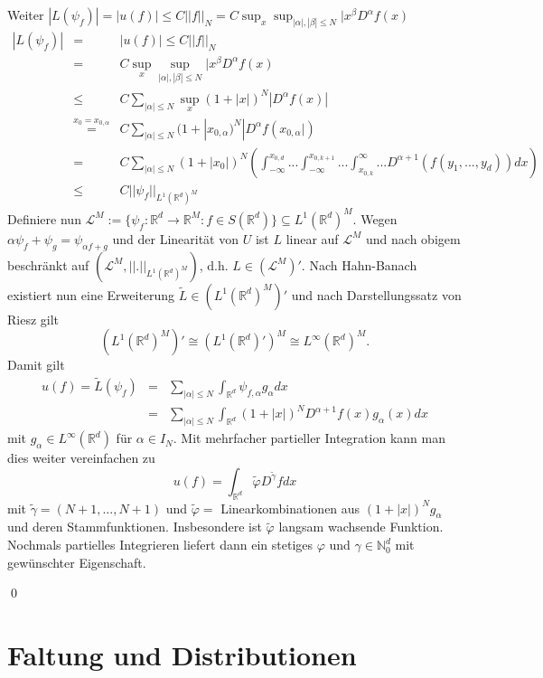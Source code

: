 \documentclass[12pt]{extreport} %
\numberwithin{equation}{section}
\newcommand{\R}{\mathbb{R}} %
\newcommand{\N}{\mathbb{N}} %
\begin{document}
\begin{enumerate}
		Weiter $|L(\psi_f)| = |u(f)|\leq C||f||_N = C\sup_x \sup_{|\alpha|,|\beta|\leq N}|x^\beta D^\alpha f(x)$
		\begin{eqnarray}
			|L(\psi_f)| &=& |u(f)|\leq C||f||_N\nonumber\\
			&=& C\sup_x \sup_{|\alpha|,|\beta|\leq N}|x^\beta D^\alpha f(x)\nonumber\\
			&\leq & C\sum_{|\alpha|\leq N} \sup_x(1+|x|)^N|D^\alpha f(x)|\nonumber\\
			&\overset{x_0 = x_{0,\alpha}}{=}& C\sum_{|\alpha|\leq N} (1+|x_{0,\alpha})^N|D^\alpha f(x_{0,\alpha}|)\nonumber\\
			&=& C \sum_{|\alpha|\leq N} (1+|x_0|)^N \left( \int_{-\infty}^{x_{0,d}}...\int_{-\infty}^{x_{0,k+1}}...\int_{x_{0,k}}^{\infty}... D^{\alpha+1}(f(y_1,...,y_d))dx  \right)\nonumber\\
			&\leq& C||\psi_f||_{L^1(\R^d)^M}\nonumber
		\end{eqnarray}
		Definiere nun $\mathcal{L}^M:=\{\psi_f:\R^d\rightarrow\R^M: f\in S(\R^d) \}\subseteq L^1(\R^d)^M$. Wegen $\alpha\psi_f+\psi_g = \psi_{\alpha f+g}$ und der Linearität von $U$ ist $L$ linear auf $\mathcal{L}^M$ und nach obigem beschränkt auf $(\mathcal{L}^M,||.||_{L^1(\R^d)^M})$, d.h. $L\in (\mathcal{L}^{M})'$. Nach Hahn-Banach existiert nun eine Erweiterung $\tilde{L}\in (L^1(\R^d)^M)'$ und nach Darstellungssatz von Riesz gilt
		$$(L^1(\R^d)^M)'\cong (L^1(\R^d)')^M\cong L^\infty(\R^d)^M.$$
		Damit gilt 
		\begin{eqnarray}
			u(f) = \tilde{L}(\psi_f) &=& \sum_{|\alpha|\leq N}\int_{\R^d}\psi_{f,\alpha}g_\alpha dx\nonumber\\
			&=&\sum_{|\alpha|\leq N}\int_{\R^d} (1+|x|)^N D^{\alpha + 1}f(x) g_\alpha(x) dx\nonumber
		\end{eqnarray}
		mit $g_\alpha\in L^\infty(\R^d)$ für $\alpha\in I_N$.
		Mit mehrfacher partieller Integration kann man dies weiter vereinfachen zu
		$$u(f) = \int_{\R^d} \tilde{\varphi}D^{\tilde{\gamma}}f dx$$
		mit $\tilde{\gamma} = (N+1,...,N+1)$ und $\tilde{\varphi}=$ Linearkombinationen aus $(1+|x|)^Ng_\alpha$ und deren Stammfunktionen. Insbesondere ist $\tilde{\varphi}$ langsam wachsende Funktion. Nochmals partielles Integrieren liefert dann ein stetiges $\varphi$ und $\gamma\in \N_0^d$ mit gewünschter Eigenschaft.
	\end{enumerate}
	\qed
	
	\section{Faltung und Distributionen}
	
\end{document}
